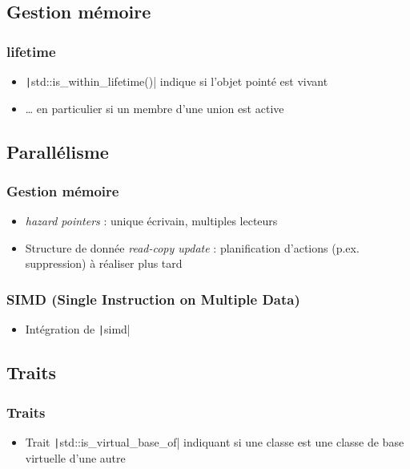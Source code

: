 \documentclass[C++.tex]{subfiles}
\begin{document}
\subsection*{Gestion mémoire}
\begin{frame}[fragile]
	\frametitle{lifetime}
	\begin{itemize}
		\item \texttt|std::is_within_lifetime()| indique si l'objet pointé est vivant
		\item \ldots{} en particulier si un membre d'une union est active
	\end{itemize}

\end{frame}

\subsection*{Parallélisme}
\begin{frame}[fragile]
	\frametitle{Gestion mémoire}
	\begin{itemize}
		\item \textit{hazard pointers} : unique écrivain, multiples lecteurs
		\item Structure de donnée \textit{read-copy update} : planification d'actions (p.ex. suppression) à réaliser plus tard
	\end{itemize}

\end{frame}

\begin{frame}[fragile]
	\frametitle{SIMD (Single Instruction on Multiple Data)}
	\begin{itemize}
		\item Intégration de \texttt|simd|
	\end{itemize}

\end{frame}

\subsection*{Traits}
\begin{frame}[fragile]
	\frametitle{Traits}
	\begin{itemize}
		\item Trait \texttt|std::is_virtual_base_of| indiquant si une classe est une classe de base virtuelle d'une autre
	\end{itemize}

\end{frame}
\end{document}
